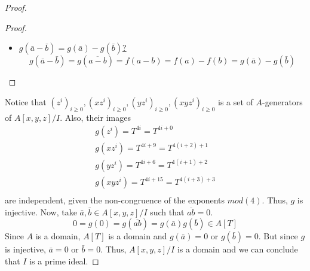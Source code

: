 \begin{problem}
\begin{sol}
\begin{proof}
\begin{claim}
\begin{proof}
\begin{itemize}
                        \item
                        \underline{$g(\bar{a} - \bar{b}) = g(\bar{a}) - g(\bar{b})$?}
                        \[ g(\bar{a} - \bar{b}) = g(\overline{a - b}) = f(a - b) = f(a) - f(b) = g(\bar{a}) - g(\bar{b}) \]
                    \end{itemize}
                \end{proof}
            \end{claim}
            Notice that $(z^i)_{i \geq 0}, (x z^i)_{i \geq 0}, (y z^i)_{i \geq 0}, ( x y z^i)_{i \geq 0}$ is a set of $A$-generators of $A[x,y,z]/I$.
            Also, their images
            \begin{align*}
            g(z^i) = T^{4i} = T^{4i + 0} \\
            g(x z^i) = T^{4i + 9} = T^{4(i + 2) + 1} \\
            g(y z^i) = T^{4i + 6} = T^{4(i + 1) + 2} \\
            g(x y z^i) = T^{4i + 15} = T^{4(i + 3) + 3} \\
            \end{align*}
            are independent, given the non-congruence of the exponents $mod(4)$.
            Thus, $g$ is injective.
            Now, take $\bar{a}, \bar{b} \in A[x,y,z]/I$ such that $\overline{ab} = 0$.
            \[ 0 = g(0) = g(\overline{ab}) = g(\bar{a})g(\bar{b}) \in A[T] \]
            Since $A$ is a domain, $A[T]$ is a domain and $g(\bar{a}) = 0$ or $g(\bar{b}) = 0$.
            But since $g$ is injective, $\bar{a} = 0$ or $\bar{b} = 0$.
            Thus, $A[x,y,z]/I$ is a domain and we can conclude that $I$ is a prime ideal.
        \end{proof}
    \end{sol}
\end{problem}

